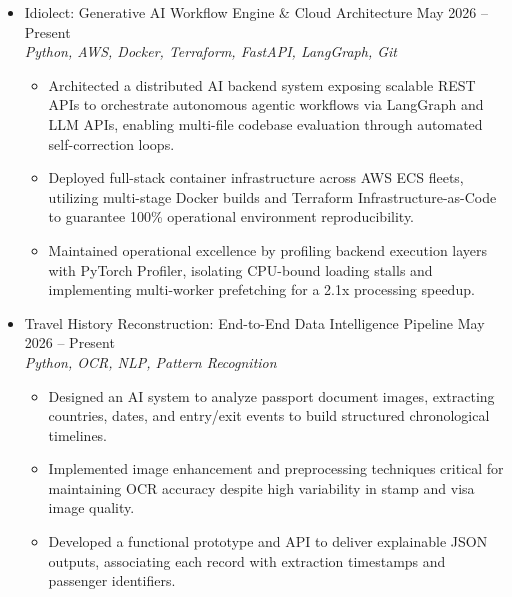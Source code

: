 \documentclass[letterpaper,11pt]{article}
\begin{document}
\begin{itemize}[leftmargin=0.15in, label={}]
    \item{
        Idiolect: Generative AI Workflow Engine \& Cloud Architecture \hfill May 2026 -- Present \\ \emph{Python, AWS, Docker, Terraform, FastAPI, LangGraph, Git}
        \begin{itemize}[leftmargin=0.25in, label={$\bullet$}]
            \item Architected a distributed AI backend system exposing scalable REST APIs to orchestrate autonomous agentic workflows via LangGraph and LLM APIs, enabling multi-file codebase evaluation through automated self-correction loops.
            \item Deployed full-stack container infrastructure across AWS ECS fleets, utilizing multi-stage Docker builds and Terraform Infrastructure-as-Code to guarantee 100\% operational environment reproducibility.
            \item Maintained operational excellence by profiling backend execution layers with PyTorch Profiler, isolating CPU-bound loading stalls and implementing multi-worker prefetching for a 2.1x processing speedup.
        \end{itemize}
    }

    \item{
        Travel History Reconstruction: End-to-End Data Intelligence Pipeline \hfill May 2026 -- Present \\ \emph{Python, OCR, NLP, Pattern Recognition}
        \begin{itemize}[leftmargin=0.25in, label={$\bullet$}]
            \item Designed an AI system to analyze passport document images, extracting countries, dates, and entry/exit events to build structured chronological timelines.
            \item Implemented image enhancement and preprocessing techniques critical for maintaining OCR accuracy despite high variability in stamp and visa image quality.
            \item Developed a functional prototype and API to deliver explainable JSON outputs, associating each record with extraction timestamps and passenger identifiers.
        \end{itemize}
    }


\end{itemize}
\end{document}
